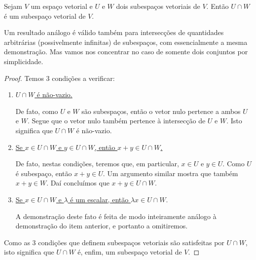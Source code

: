 \begin{theorem}
	Sejam $V$ um espaço vetorial e $U$ e $W$ dois subespaços vetoriais de $V$. Então $U\cap W$ é um subespaço vetorial de $V$.
\end{theorem}

Um resultado análogo é válido também para intersecções de quantidades arbitrárias (possivelmente infinitas) de subespaços, com essencialmente a mesma demonstração. Mas vamos nos concentrar no caso de somente dois conjuntos por simplicidade.

\begin{proof}
	Temos 3 condições a verificar:
	\begin{enumerate}
	\item \uline{$U\cap W$ é não-vazio.}
	
	De fato, como $U$ e $W$ são subespaços, então o vetor nulo pertence a ambos $U$ e $W$. Segue que o vetor nulo também pertence à intersecção de $U$ e $W$. Isto significa que $U\cap W$ é não-vazio.
	\item \uline{Se $x\in U\cap W$ e $y\in U\cap W$, então $x+y\in U\cap W$.}
	
	De fato, nestas condições, teremos que, em particular, $x\in U$ e $y\in U$. Como $U$ é subespaço, então $x+y\in U$. Um argumento similar mostra que também $x+y\in W$. Daí concluímos que $x+y\in U\cap W$.
	
	\item \uline{Se $x\in U\cap W$ e $\lambda$ é um escalar, então $\lambda x\in U\cap W$}.
	
	A demonstração deste fato é feita de modo inteiramente análogo à demonstração do item anterior, e portanto a omitiremos.
	\end{enumerate}
	
	Como as 3 condições que definem subespaços vetoriais são satisfeitas por $U\cap W$, isto significa que $U\cap W$ é, enfim, um subespaço vetorial de $V$.
\end{proof}